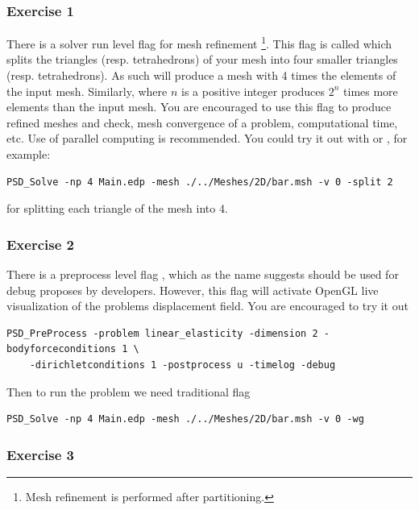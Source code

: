 {{\subsubsection{Exercise  1}

There is a solver run level flag for mesh refinement \footnote{Mesh refinement is performed after partitioning.}. This flag is called  which splits the triangles (resp. tetrahedrons) of your mesh into  four smaller  triangles (resp. tetrahedrons). As such  will produce a mesh with 4 times the elements of the input mesh. Similarly,  where $n$ is a positive integer produces $2^n$ times more elements than the input mesh. You are encouraged to use this  flag to produce refined meshes and check, mesh convergence of a problem, computational time, etc. Use of parallel computing is recommended. You could try it out with  or , for example:

\begin{lstlisting}[style=BashInputStyle]
	PSD_Solve -np 4 Main.edp -mesh ./../Meshes/2D/bar.msh -v 0 -split 2
\end{lstlisting}

for splitting each triangle of the mesh   into 4. 


\subsubsection{Exercise  2}

There is a preprocess level flag , which as the name suggests should be used for debug proposes by developers. However, this flag will activate OpenGL live visualization of the problems displacement field. You are encouraged to try it out 

\begin{lstlisting}[style=BashInputStyle]
	PSD_PreProcess -problem linear_elasticity -dimension 2 -bodyforceconditions 1 \
	-dirichletconditions 1 -postprocess u -timelog -debug
\end{lstlisting}

Then to run the problem we need traditional  flag

\begin{lstlisting}[style=BashInputStyle]
	PSD_Solve -np 4 Main.edp -mesh ./../Meshes/2D/bar.msh -v 0 -wg
\end{lstlisting}

\subsubsection{Exercise  3}

}}
